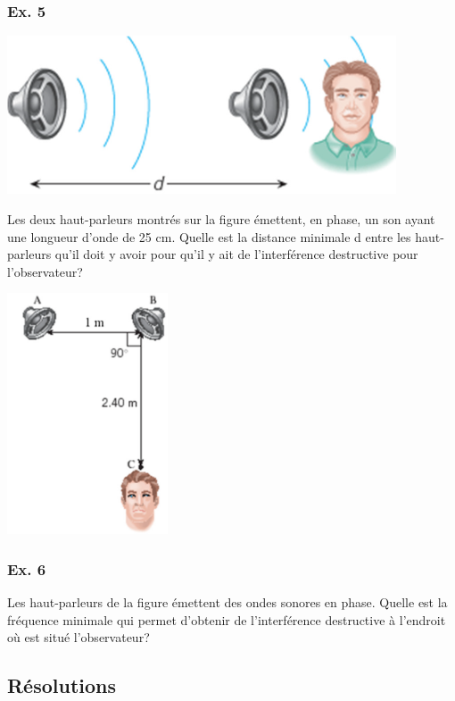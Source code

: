 {\subsubsection{Ex. 5}

\includegraphics[width=11.546cm,height=4.688cm]{Pictures/1000000100000363000001603D3E7105AB252F90.png}

Les
deux haut-parleurs montrés sur la figure émettent, en phase, un son
ayant une longueur d'onde de 25 cm. Quelle est la distance minimale d
entre les haut-parleurs qu'il doit y avoir pour qu'il y ait de
l'interférence destructive pour l'observateur?

\includegraphics[width=4.757cm,height=7.147cm]{Pictures/10000001000001BA00000298E2F6E319C348E061.png}

\subsubsection{Ex. 6}

Les haut-parleurs de la figure émettent des ondes sonores en phase.
Quelle est la fréquence minimale qui permet d'obtenir de l'interférence
destructive à l'endroit où est situé l'observateur?

\subsection{Résolutions}

}
